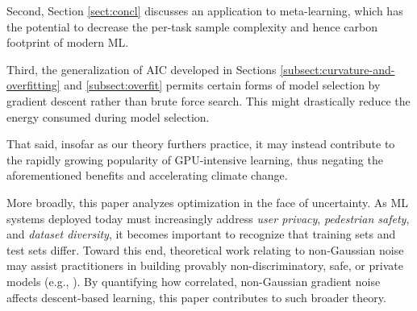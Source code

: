 \documentclass{article}
\theoremstyle{plain}
\theoremstyle{definition}
\begin{document}
    Second, Section \ref{sect:concl} discusses an application to meta-learning,
    which has the potential to decrease the per-task sample complexity and
    hence carbon footprint of modern ML.
     
    Third, the generalization of AIC developed in  Sections
    \ref{subsect:curvature-and-overfitting} and \ref{subsect:overfit} permits
    certain forms of model selection by gradient descent rather than brute
    force search.  This might drastically reduce the energy consumed during
    model selection.

    That said, insofar as our theory furthers practice, it may instead
    contribute to the rapidly growing popularity of GPU-intensive learning,
    thus negating the aforementioned benefits and accelerating climate change.

    More broadly, this paper analyzes optimization in the face of uncertainty.
    As ML systems deployed today must increasingly address \emph{user privacy},
    \emph{pedestrian safety}, and \emph{dataset diversity}, it becomes
    important to recognize that training sets and test sets
    differ.  Toward this end, theoretical work relating to non-Gaussian noise
    may assist practitioners in building provably non-discriminatory, safe, or
    private models (e.g., \cite{dw06}).  By quantifying how correlated,
    non-Gaussian gradient noise affects descent-based learning, this paper
    contributes to such broader theory.



\end{document}
